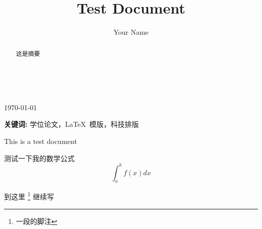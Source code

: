 \documentclass[a4paper,11pt,twoside,openany]{article}
\begin{document}
\tableofcontents
\thispagestyle{empty} 　　　%
\author{Your Name}
\title{Test Document}
\maketitle
\today %
\begin{abstract}
这是摘要
\end{abstract}
\vfill %
\textbf{关键词:} 学位论文，\LaTeX\ 模版，科技排版


This is a test document
\newline %

测试一下我的数学公式\[\int_a^b f(x)dx\]

到这里
\footnote{一段的脚注}
继续写
\end{document}

